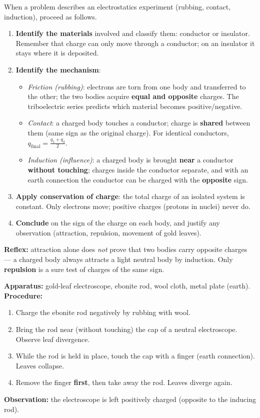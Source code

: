 \documentclass[11pt]{article}
\newcommand{\cle}[1]{{\popxbold\color{popdark}#1}}
\newcounter{popsec}
\newcounter{popsub}
\newcommand{\courssub}[1]{%
  \stepcounter{popsub}%
  \par\vspace{9pt}\noindent{\popxbold\fontsize{11.5}{13}\selectfont\color{popink}{\color{poporange}\thepopsec.\thepopsub}\hspace{6pt}#1}\par\nopagebreak\vspace{4pt}
}
\begin{document}
\courssub{Methods of Charging}

\begin{methode}
When a problem describes an electrostatics experiment (rubbing, contact, induction), proceed as follows.
\begin{enumerate}
\item \textbf{Identify the materials} involved and classify them: conductor or insulator. Remember that charge can only move through a \cle{conductor}; on an \cle{insulator} it stays where it is deposited.
\item \textbf{Identify the mechanism}:
\begin{itemize}
\item \emph{Friction (rubbing)}: electrons are torn from one body and transferred to the other; the two bodies acquire \textbf{equal and opposite} charges. The triboelectric series predicts which material becomes positive/negative.
\item \emph{Contact}: a charged body touches a conductor; charge is \textbf{shared} between them (same sign as the original charge). For identical conductors, $q_{\text{final}} = \frac{q_1+q_2}{2}$.
\item \emph{Induction (influence)}: a charged body is brought \textbf{near} a conductor \textbf{without touching}; charges inside the conductor separate, and with an earth connection the conductor can be charged with the \textbf{opposite} sign.
\end{itemize}
\item \textbf{Apply conservation of charge}: the total charge of an isolated system is constant. Only \cle{electrons} move; positive charges (protons in nuclei) never do.
\item \textbf{Conclude} on the sign of the charge on each body, and justify any observation (attraction, repulsion, movement of gold leaves).
\end{enumerate}
\textbf{Reflex:} attraction alone does \emph{not} prove that two bodies carry opposite charges --- a charged body always attracts a light neutral body by induction. Only \textbf{repulsion} is a sure test of charges of the same sign.
\end{methode}

\begin{experience}
\textbf{Apparatus:} gold-leaf electroscope, ebonite rod, wool cloth, metal plate (earth).
\textbf{Procedure:}
\begin{enumerate}
\item Charge the ebonite rod negatively by rubbing with wool.
\item Bring the rod near (without touching) the cap of a neutral electroscope. Observe leaf divergence.
\item While the rod is held in place, touch the cap with a finger (earth connection). Leaves collapse.
\item Remove the finger \textbf{first}, then take away the rod. Leaves diverge again.
\end{enumerate}
\textbf{Observation:} the electroscope is left positively charged (opposite to the inducing rod).
\end{experience}
\end{document}

